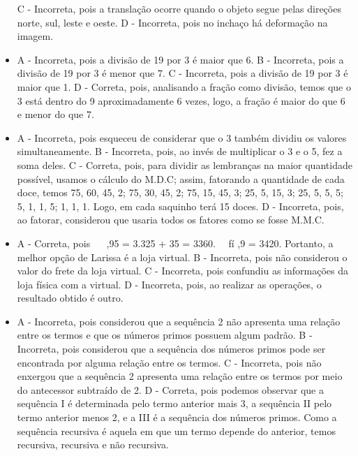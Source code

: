 \begin{itemize}
C - Incorreta, pois a translação ocorre quando o objeto segue pelas
direções norte, sul, leste e oeste.
D - Incorreta, pois no inchaço há deformação na imagem.
\item A - Incorreta, pois a divisão de 19 por 3 é maior que 6.
B - Incorreta, pois a divisão de 19 por 3 é menor que 7.
C - Incorreta, pois a divisão de 19 por 3 é maior que 1.
D - Correta, pois, analisando a fração como divisão, temos que o 3 está
dentro do 9 aproximadamente 6 vezes, logo, a fração é maior do que 6 e
menor do que 7.
\item A - Incorreta, pois esqueceu de considerar que o 3 também dividiu os
valores simultaneamente.
B - Incorreta, pois, ao invés de multiplicar o 3 e o 5, fez a soma
deles.
C - Correta, pois, para dividir as lembranças na maior quantidade
possível, usamos o cálculo do M.D.C; assim, fatorando a quantidade de
cada doce, temos 75, 60, 45, 2; 75, 30, 45, 2; 75, 15, 45, 3; 25, 5, 15, 3; 25, 5, 5, 5; 5, 1, 1, 5; 1, 1, 1. Logo, em cada saquinho terá 15 doces.
D - Incorreta, pois, ao fatorar, considerou que usaria todos os fatores
como se fosse M.M.C.
\item A - Correta, pois \ \   ,95 = 3.325 + 35 = 3360. \ \ fí  ,9 = 3420. Portanto, a melhor opção de Larissa é a loja virtual.
B - Incorreta, pois não considerou o valor do frete da loja virtual.
C - Incorreta, pois confundiu as informações da loja física com a
virtual.
D - Incorreta, pois, ao realizar as operações, o resultado obtido é
outro.
\item A - Incorreta, pois considerou que a sequência 2 não apresenta uma
relação entre os termos e que os números primos possuem algum padrão.
B - Incorreta, pois considerou que a sequência dos números primos pode
ser encontrada por alguma relação entre os termos.
C - Incorreta, pois não enxergou que a sequência 2 apresenta uma relação
entre os termos por meio do antecessor subtraído de 2.
D - Correta, pois podemos observar que a sequência I é determinada pelo
termo anterior mais 3, a sequência II pelo termo anterior menos 2, e a
III é a sequência dos números primos. Como a sequência recursiva é
aquela em que um termo depende do anterior, temos recursiva, recursiva e
não recursiva.
\end{itemize}

